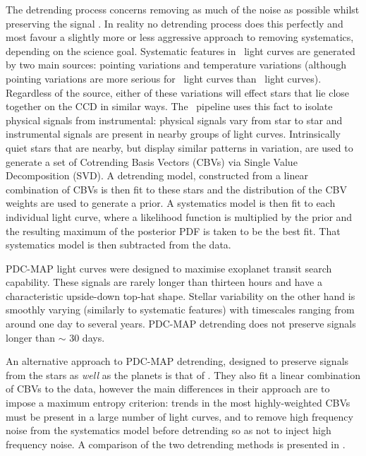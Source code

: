 The detrending process concerns removing as much of the noise as possible
whilst preserving the signal \citep{Smith2012, Stumpe2012}.
In reality no detrending process does this perfectly and most favour a
slightly more or less aggressive approach to removing systematics, depending
on the science goal.
Systematic features in \kepler\ light curves are generated by two main
sources: pointing variations and temperature variations (although pointing
variations are more serious for \ktwo\ light curves than \kepler\ light
curves).
Regardless of the source, either of these variations will effect stars that
lie close together on the CCD in similar ways.
The \kepler\ pipeline uses this fact to isolate physical signals from
instrumental: physical signals vary from star to star and instrumental signals
are present in nearby groups of light curves.
Intrinsically quiet stars that are nearby, but display similar patterns in
variation, are used to generate a set of Cotrending Basis Vectors (CBVs) via
Single Value Decomposition (SVD).
A detrending model, constructed from a linear combination of CBVs is then fit
to these stars and the distribution of the CBV weights are used to generate a
prior.
A systematics model is then fit to each individual light curve, where a
likelihood function is multiplied by the prior and the resulting maximum of
the posterior PDF is taken to be the best fit.
That systematics model is then subtracted from the data.

PDC-MAP light curves were designed to maximise exoplanet transit search
capability.
These signals are rarely longer than thirteen hours and have a characteristic
upside-down top-hat shape.
Stellar variability on the other hand is smoothly varying (similarly to
systematic features) with timescales ranging from around one day to several
years.
PDC-MAP detrending does not preserve signals longer than $\sim$ 30 days.

An alternative approach to PDC-MAP detrending, designed to preserve signals
from the stars as {\it well} as the planets is that of \citet{Roberts2013}.
They also fit a linear combination of CBVs to the data, however the main
differences in their approach are to impose a maximum entropy criterion:
trends in the most highly-weighted CBVs must be present in a large number of
light curves, and to remove high frequency noise from the systematics model
before detrending so as not to inject high frequency noise.
A comparison of the two detrending methods is presented in
\citet{Roberts2013}.

